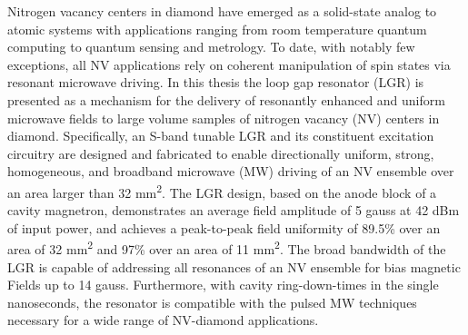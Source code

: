 % 
% 
%



Nitrogen vacancy centers in diamond have emerged as a solid-state analog to atomic systems with applications ranging from room temperature quantum computing to quantum sensing and metrology. To date, with notably few exceptions, all NV applications rely on coherent manipulation of spin states via resonant microwave driving. In this thesis the loop gap resonator (LGR) is presented as a mechanism for the delivery of resonantly enhanced and uniform microwave fields to large volume samples of nitrogen vacancy (NV) centers in diamond. Specifically, an S-band tunable LGR and its constituent excitation circuitry are designed and fabricated to enable directionally uniform, strong, homogeneous, and broadband
microwave (MW) driving of an NV ensemble over an area larger than 32 mm\textsuperscript{2}. The LGR design, based on the anode
block of a cavity magnetron, demonstrates an average field amplitude of 5 gauss at 42 dBm of input power, and achieves a peak-to-peak
field uniformity of 89.5\% over an area of 32 mm\textsuperscript{2} and 97\% over an area of 11 mm\textsuperscript{2}. The broad bandwidth of the LGR is capable of addressing all resonances of an NV ensemble for bias magnetic Fields up to 14 gauss. Furthermore, with cavity
ring-down-times in the single nanoseconds, the resonator is compatible with the pulsed MW techniques necessary for a wide range of NV-diamond
applications.

